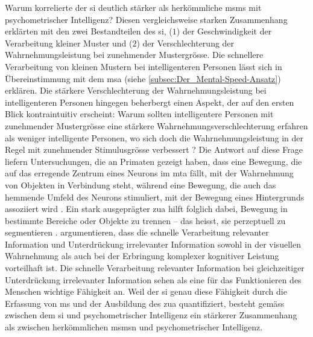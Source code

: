 \documentclass[11pt, twoside, a4paper]{book}		%
\begin{document}
Warum korrelierte der \gls{si} deutlich stärker \citep[Studie 1: $r~=~.64$ und Studie~2: $r~=~.71$;][]{Melnick2013} als herkömmliche \glspl{msm} \citep[$r~=~-.24$;][]{Sheppard2008} mit  psychometrischer Intelligenz? Diesen vergleichsweise starken Zusammenhang erklärten \citet{Melnick2013} mit den zwei Bestandteilen des \gls{si}, ($1$) der Geschwindigkeit der Verarbeitung kleiner Muster und ($2$) der Verschlechterung der Wahrnehmungsleistung bei zunehmender Mustergrösse. Die schnellere Verarbeitung von kleinen Mustern bei intelligenteren Personen lässt sich in Übereinstimmung mit dem \gls{msa} (siehe \autoref{subsec:Der_Mental-Speed-Ansatz}) erklären. Die stärkere Verschlechterung der Wahrnehmungsleistung bei intelligenteren Personen hingegen beherbergt einen Aspekt, der auf den ersten Blick kontraintuitiv erscheint: 
Warum sollten intelligentere Personen mit zunehmender Mustergrösse eine stärkere Wahrnehmungsverschlechterung erfahren als weniger intelligente Personen, wo sich doch die Wahrnehmungsleistung in der Regel mit zunehmender Stimulusgrösse verbessert \citep{Anderson1987, Henrie2001}? Die Antwort auf diese Frage liefern Untersuchungen, die an Primaten gezeigt haben, dass eine Bewegung, die auf das erregende Zentrum eines Neurons im \gls{mta} fällt, mit der Wahrnehmung von Objekten in Verbindung steht, während eine Bewegung, die auch das hemmende Umfeld des Neurons stimuliert, mit der Bewegung eines Hintergrunds assoziiert wird \citep{Born2000, Churan2008, Regan2000}. 
Ein stark ausgeprägter \gls{zua} hilft folglich dabei, Bewegung in bestimmte Bereiche oder Objekte zu trennen -- das heisst, sie perzeptuell zu segmentieren \citep{Braddick1993}.
\citeauthor{Melnick2013} argumentieren, dass die schnelle Verarbeitung relevanter Information und Unterdrückung irrelevanter Information sowohl in der visuellen Wahrnehmung \citep[Trennung zwischen bewegtem Objekt und Hintergrund; siehe][]{Born2000, Churan2008} als auch bei der Erbringung komplexer kognitiver Leistung \citep[Aufmerksamkeitslenkung auf relevante Information und Unterdrückung von Interferenzen; siehe][]{Burgess2011, Engle1999, Zanto2009} vorteilhaft ist. 
Die schnelle Verarbeitung relevanter Information bei gleichzeitiger Unterdrückung irrelevanter Information sehen \citeauthor{Melnick2013} als eine für das Funktionieren des Menschen wichtige Fähigkeit an. Weil der \gls{si} genau diese Fähigkeit durch die Erfassung von \gls{ms} und der Ausbildung des \gls{zua} quantifiziert, besteht gemäss \citeauthor{Melnick2013} zwischen dem \gls{si} und psychometrischer Intelligenz ein stärkerer Zusammenhang als zwischen herkömmlichen \glspl{msm}n und psychometrischer Intelligenz.
\end{document}
